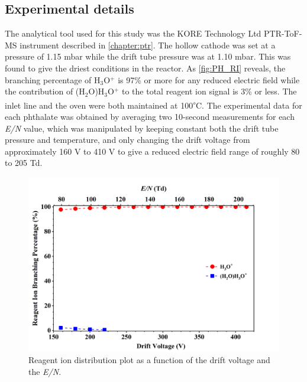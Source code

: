 
\subsection{Experimental details}

The analytical tool used for this study was the KORE Technology Ltd PTR-ToF-MS instrument described in \autoref{chapter:ptr}.
%
The hollow cathode was set at a pressure of 1.15 mbar while the drift tube pressure was at 1.10 mbar.
%
This was found to give the driest conditions in the reactor.
%
As \autoref{fig:PH_RI} reveals, the branching  percentage of H$_3$O$^+$ is   97\% or more for any reduced electric field while the contribution of  (H$_2$O)H$_3$O$^+$ to the total reagent ion signal is 3\% or less.
%
The inlet line and the oven were both maintained  at 100\textsuperscript{$\circ$}C.
%
The experimental data for each phthalate was obtained by averaging two 10-second measurements for each \textit{E/N} value, which was manipulated by keeping constant both  the drift tube pressure and  temperature, and only changing the drift voltage  from approximately 160 V to 410 V to give a reduced electric field range of roughly 80 to 205 Td.



        \begin{figure}[htb]%
        \centering
        \includegraphics[height=0.35\textheight]{pics/PH/RI-BR.png}
        \caption{Reagent ion distribution plot as a function of the drift voltage and the \textit{E/N}.}
        \label{fig:PH_RI}
        \end{figure}



